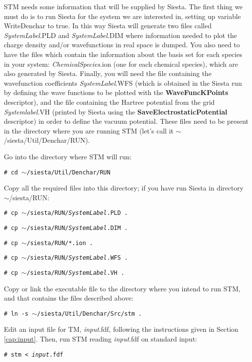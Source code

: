 {\sc STM} needs some information that will be supplied by {\sc Siesta}. 
 The first thing we must do is to run {\sc Siesta} for 
 the system we are interested in,
 setting up variable WriteDenchar to true. 
 In this way {\sc Siesta} will generate
 two files called {\it SystemLabel}.PLD and {\it SystemLabel}.DIM
 where information 
 needed to plot the charge density and/or wavefunctions 
 in real space is dumped. You also need to have the files which
 contain the information about the basis set for each species
 in your system: {\it ChemicalSpecies}.ion (one for each
 chemical species), which
 are also generated by  {\sc Siesta}.
 Finally, you will need the file containing the
 wavefunction
 coefficients {\it SystemLabel}.WFS  (which is obtained in 
 the {\sc Siesta} run by defining the wave functions to be
 plotted with the {\bf WaveFuncKPoints} descriptor),
 and the file containing the Hartree potential from the grid 
 {\it Systemlabel}.VH (printed by {\sc Siesta} using the 
 {\bf SaveElectrostaticPotential} descriptor)
 in order to define the vacuum potential. 
 These files need to be present in the
 directory where you are running {\sc STM} (let's call it
 $\sim$/siesta/Util/Denchar/RUN).

 Go into the directory where {\sc STM} will run:

 {\tt \# cd $\sim$/siesta/Util/Denchar/RUN}

 Copy all the required files into this directory; if you
 have run {\sc Siesta} in directory $\sim$/siesta/RUN:

 {\tt \# cp $\sim$/siesta/RUN/{\it SystemLabel}.PLD .}

 {\tt \# cp $\sim$/siesta/RUN/{\it SystemLabel}.DIM .}

 {\tt \# cp $\sim$/siesta/RUN/*.ion .}

 {\tt \# cp $\sim$/siesta/RUN/{\it SystemLabel}.WFS .}

 {\tt \# cp $\sim$/siesta/RUN/{\it SystemLabel}.VH .}

 Copy or link the executable file to the directory
 where you intend to run  {\sc STM}, and that
 contains the files described above:

 {\tt \# ln -s $\sim$/siesta/Util/Denchar/Src/stm . }

 Edit an input file for {\sc TM}, {\it input}.fdf, following the 
 instructions given in Section \ref{cap:input}. Then,
 run  {\sc STM} reading {\it input}.fdf on
 standard input:


 {\tt \# stm < {\it input}.fdf } 


